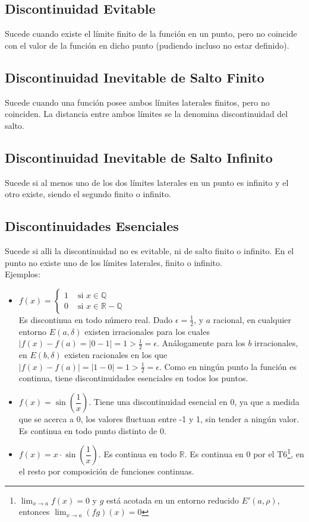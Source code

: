\documentclass[11pt,a4paper]{article}
\begin{document}
\subsection{Discontinuidad Evitable}
Sucede cuando existe el l\'imite finito de la funci\'on en un punto, pero no coincide con el valor de la funci\'on en dicho punto (pudiendo incluso no estar definido).
\subsection{Discontinuidad Inevitable de Salto Finito}
Sucede cuando una funci\'on posee ambos l\'imites laterales finitos, pero no coinciden. La distancia entre ambos l\'imites se la denomina discontinuidad del salto.
\subsection{Discontinuidad Inevitable de Salto Infinito}
Sucede si al menos uno de los dos l\'imites laterales en un punto es infinito y el otro existe, siendo el segundo finito o infinito.
\subsection{Discontinuidades Esenciales}
Sucede si alli la discontinuidad no es evitable, ni de salto finito o infinito. En el punto no existe uno de los l\'imites laterales, finito o infinito.\\
Ejemplos: 
\begin{itemize}
\item $f(x)=\left\{\begin{array}{ll} 1 & \text{ si } x \in \mathbb{Q} \\ 0 & \text{ si } x \in \mathbb{R - Q}\end{array}\right.$ \\ Es discontinua en todo n\'umero real. Dado $\epsilon = \frac{1}{2}$, y $a$ racional, en cualquier entorno $E(a,\delta)$ existen irracionales para los cuales $|f(x)-f(a) = |0-1| = 1 > \frac{1}{2} = \epsilon$. An\'alogamente para los $b$ irracionales, en $E(b,\delta)$ existen racionales en los que $|f(x)-f(a)| = |1-0| = 1 > \frac{1}{2} = \epsilon$. Como en ning\'un punto la funci\'on es continua, tiene discontinuidades esenciales en todos los puntos.
\item $f(x)=\sin\left(\dfrac{1}{x}\right)$. Tiene una discontinuidad esencial en $0$, ya que a medida que se acerca a $0$, los valores fluctuan entre -1 y 1, sin tender a ning\'un valor. Es continua en todo punto distinto de 0.
\item $f(x)=x\cdot\sin\left(\dfrac{1}{x}\right)$. Es continua en todo $\mathbb{R}$. Es continua en 0 por el T6\footnote{$\displaystyle{\lim_{x\to a}f(x) = 0}$ y $g$ est\'a acotada en un entorno reducido $E'(a,\rho)$, entonces $\displaystyle{\lim_{x\to a}(fg)(x) = 0}$}, en el resto por composici\'on de funciones continuas.
\end{itemize}
\end{document}
